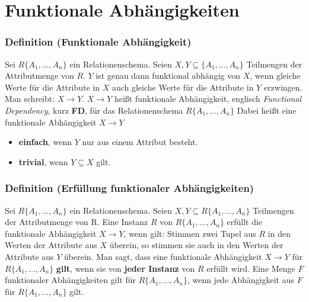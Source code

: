 \documentclass{lehramt-informatik-haupt}
\begin{document}
\chapter{Funktionale Abhängigkeiten}

%

%

\subsection{Definition (Funktionale Abhängigkeit)}

Sei $R\{A_1,...,A_n\}$ ein Relationenschema. Seien $X, Y \subseteq
\{A_1,...,A_n\}$ Teilmengen der Attributmenge von $R$. $Y$ ist genau
dann funktional abhängig von $X$, wenn gleiche Werte für die Attribute
in $X$ auch gleiche Werte für die Attribute in $Y$ erzwingen. Man
schreibt: $X \rightarrow Y$. $X \rightarrow Y$ heißt funktionale
Abhängigkeit, englisch \emph{Functional Dependency}, kurz \textbf{FD},
für das Relationenschema $R\{A_1,...,A_n\}$ Dabei heißt eine funktionale
Abhängigkeit $X \rightarrow Y$

\begin{itemize}
\item \textbf{einfach}, wenn $Y$ nur aus einem Attribut besteht.
\item \textbf{trivial}, wenn $Y \subseteq X$ gilt.
\end{itemize}

%

\subsection{Definition (Erfüllung funktionaler Abhängigkeiten)}

Sei $R\{A_1,...,A_n\}$ ein Relationenschema. Seien $X, Y \subseteq
R\{A_1,...,A_n\}$ Teilmengen der Attributmenge von R. Eine Instanz $R$
von $R\{A_1,...,A_n\}$ erfüllt die funktionale Abhängigkeit $X
\rightarrow Y$, wenn gilt: Stimmen zwei Tupel aus $R$ in den Werten der
Attribute aus $X$ überein, so stimmen sie auch in den Werten der
Attribute aus $Y$ überein. Man sagt, dass eine funktionale Abhängigkeit
$X \rightarrow Y$ für $R\{A_1,...,A_n\}$ \textbf{gilt}, wenn sie von
\textbf{jeder Instanz} von $R$ erfüllt wird. Eine Menge $F$ funktionaler
Abhängigkeiten gilt für $R\{A_1,...,A_n\}$, wenn jede Abhängigkeit aus
$F$ für $R\{A_1,...,A_n\}$ gilt.
\end{document}
